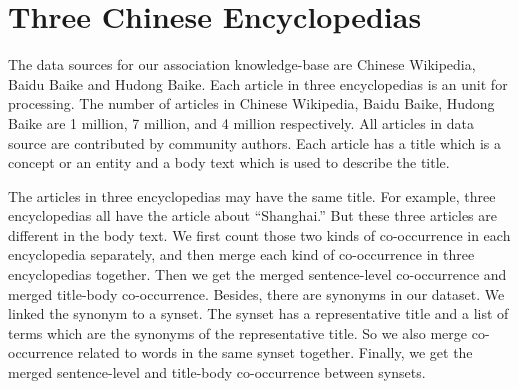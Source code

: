 \section{Three Chinese Encyclopedias}
The data sources for our association knowledge-base are Chinese Wikipedia,
Baidu Baike and Hudong Baike. Each article in three encyclopedias is
an unit for processing. The number of articles in Chinese Wikipedia,
Baidu Baike, Hudong Baike are 1 million, 7 million, and 4 million respectively.
All articles in data source are contributed by community
authors. Each article has a title which is a concept or an entity
and a body text which is used to describe the title.

%

The articles in three encyclopedias may have the same title.
For example, three encyclopedias all have the article about ``Shanghai.''
But these three articles are different in the body text. We first count those
two kinds of co-occurrence in each encyclopedia separately, and then merge
each kind of co-occurrence in three encyclopedias together. Then we get the merged
sentence-level co-occurrence and merged title-body co-occurrence.
Besides, there are synonyms in our dataset. We linked the synonym to a synset.
The synset has a representative title and a list of terms which are the synonyms of the representative title.
So we also merge co-occurrence related to words in the same synset together.
Finally, we get the merged sentence-level and title-body co-occurrence between synsets.
